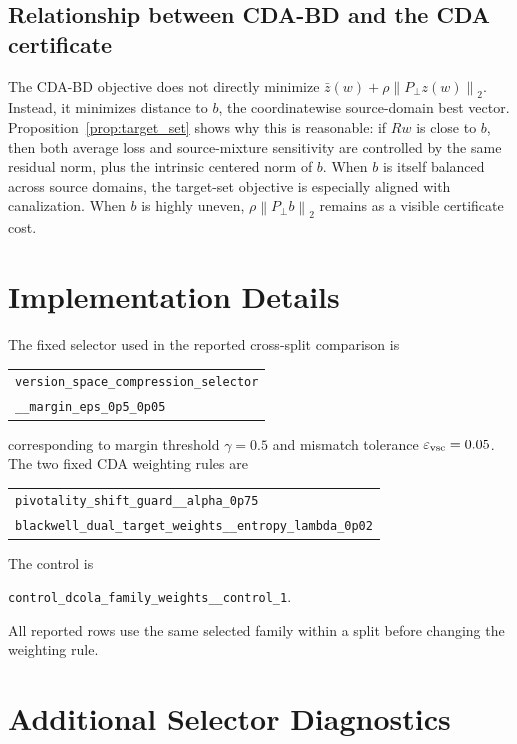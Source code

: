 \documentclass{article}
\theoremstyle{definition}
\newcommand{\eps}{\varepsilon}
\newcommand{\bd}{\textup{\textsc{CDA-BD}}}
\newcommand{\norm}[1]{\left\lVert #1 \right\rVert}
\begin{document}
\subsection{Relationship between \bd{} and the CDA certificate}

The \bd{} objective does not directly minimize \(\bar z(w)+\rho\norm{P_\perp z(w)}_2\). Instead, it minimizes distance to \(b\), the coordinatewise source-domain best vector. Proposition~\ref{prop:target_set} shows why this is reasonable: if \(Rw\) is close to \(b\), then both average loss and source-mixture sensitivity are controlled by the same residual norm, plus the intrinsic centered norm of \(b\). When \(b\) is itself balanced across source domains, the target-set objective is especially aligned with canalization. When \(b\) is highly uneven, \(\rho\norm{P_\perp b}_2\) remains as a visible certificate cost.

\section{Implementation Details}

The fixed selector used in the reported cross-split comparison is
\begin{center}
\footnotesize
\begin{tabular}{@{}l@{}}
\texttt{version\_space\_compression\_selector}\\
\texttt{\_\_margin\_eps\_0p5\_0p05}
\end{tabular}
\end{center}
corresponding to margin threshold \(\gamma=0.5\) and mismatch tolerance \(\eps_{\rm vsc}=0.05\). The two fixed CDA weighting rules are
\begin{center}
\footnotesize
\begin{tabular}{@{}l@{}}
\texttt{pivotality\_shift\_guard\_\_alpha\_0p75}\\
\texttt{blackwell\_dual\_target\_weights\_\_entropy\_lambda\_0p02}
\end{tabular}
\end{center}
The control is
\begin{center}
\footnotesize
\texttt{control\_dcola\_family\_weights\_\_control\_1}.
\end{center}
All reported rows use the same selected family within a split before changing the weighting rule.

\section{Additional Selector Diagnostics}
\end{document}
